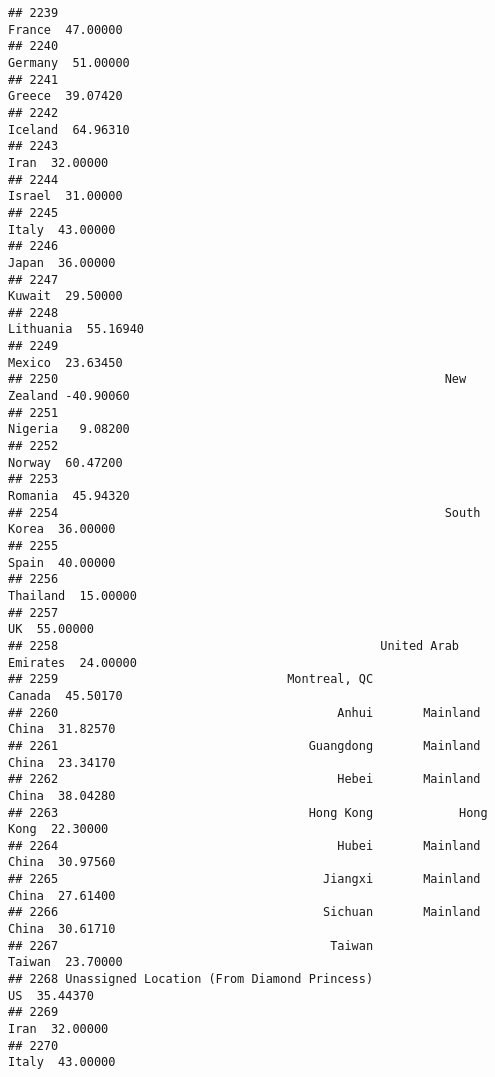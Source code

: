 \documentclass[
]{article}
\begin{document}
\begin{verbatim}
## 2239                                                           France  47.00000
## 2240                                                          Germany  51.00000
## 2241                                                           Greece  39.07420
## 2242                                                          Iceland  64.96310
## 2243                                                             Iran  32.00000
## 2244                                                           Israel  31.00000
## 2245                                                            Italy  43.00000
## 2246                                                            Japan  36.00000
## 2247                                                           Kuwait  29.50000
## 2248                                                        Lithuania  55.16940
## 2249                                                           Mexico  23.63450
## 2250                                                      New Zealand -40.90060
## 2251                                                          Nigeria   9.08200
## 2252                                                           Norway  60.47200
## 2253                                                          Romania  45.94320
## 2254                                                      South Korea  36.00000
## 2255                                                            Spain  40.00000
## 2256                                                         Thailand  15.00000
## 2257                                                               UK  55.00000
## 2258                                             United Arab Emirates  24.00000
## 2259                                Montreal, QC               Canada  45.50170
## 2260                                       Anhui       Mainland China  31.82570
## 2261                                   Guangdong       Mainland China  23.34170
## 2262                                       Hebei       Mainland China  38.04280
## 2263                                   Hong Kong            Hong Kong  22.30000
## 2264                                       Hubei       Mainland China  30.97560
## 2265                                     Jiangxi       Mainland China  27.61400
## 2266                                     Sichuan       Mainland China  30.61710
## 2267                                      Taiwan               Taiwan  23.70000
## 2268 Unassigned Location (From Diamond Princess)                   US  35.44370
## 2269                                                             Iran  32.00000
## 2270                                                            Italy  43.00000

\end{verbatim}
\end{document}
